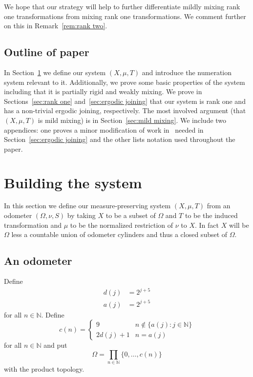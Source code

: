 \documentclass[10pt]{amsart}
\theoremstyle{definition}\newtheorem{defi}[theo]{Definition}\newtheorem{rema}[theo]{Remark}\newtheorem{exam}[theo]{Example}\newtheorem{exem}[theo]{Example}\newtheorem{nota}[theo]{Notation}
\newcommand{\N}{\mathbb{N}}
\begin{document}
We hope that our strategy will help to further differentiate mildly mixing rank one transformations from mixing rank one transformations. We comment further on this in Remark~\ref{rem:rank two}.

\subsection{Outline of paper} 

In Section~\ref{sec:system} we define our system $(X,\mu,T)$ and introduce the numeration system relevant to it. Additionally, we prove some basic properties of the system including that it is partially rigid and weakly mixing. We prove in Sections~\ref{sec:rank one} and~\ref{sec:ergodic joining} that our system is rank one and has a non-trivial ergodic joining, respectively. The most involved argument (that $(X,\mu,T)$ is mild mixing) is in Section~\ref{sec:mild mixing}. We include two appendices: one proves a minor modification of work in~\cite{MR4269425} needed in Section~\ref{sec:ergodic joining} and the other lists notation used throughout the paper.



\section{Building the system}\label{sec:system}

In this section we define our measure-preserving system $(X,\mu,T)$ from an odometer $(\Omega,\nu,S)$ by taking $X$ to be a subset of $\Omega$ and $T$ to be the induced transformation and $\mu$ to be the normalized restriction of $\nu$ to $X$. In fact $X$ will be $\Omega$ less a countable union of odometer cylinders and thus a closed subset of $\Omega$.

\subsection{An odometer}

Define
\begin{align*}
d(j) &{} = 2^{j+5} \\
a(j) &{} = 2^{j+5}
\end{align*}
for all $n \in \N$. Define
\[
c(n) =
\begin{cases}
9 & n \notin \{ a(j) : j \in \N \} \\
2 d(j) + 1 & n = a(j)
\end{cases}
\]
for all $n \in \N$ and put
\[
\Omega = \prod_{n \in \N} \{0,\dots,c(n) \}
\]
with the product topology.
\end{document}
